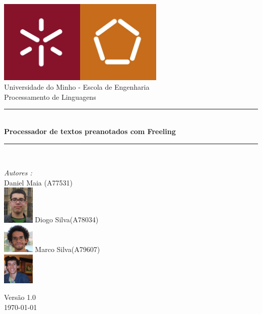\documentclass[a4paper]{article}
\begin{document}
\begin{titlepage}
\begin{center}


\includegraphics[width=0.6\textwidth]{logo.jpg}\\[0.5cm]

{\large Universidade do Minho - Escola de Engenharia}\\[0.5cm]

{\large Processamento de Linguagens}\\[0.5cm]

\rule{\linewidth}{0.5mm} \\[0.4cm]
{ \huge \bfseries Processador de textos preanotados com Freeling\\[0.4cm] }
\rule{\linewidth}{0.5mm} \\[1.5cm]

\noindent
\begin{minipage}{0.4\textwidth}
  \begin{flushleft} \large
    \emph{Autores :}\\
    Daniel Maia \textsc{(A77531)}\\
    \includegraphics[width=1.5cm]{daniel.jpg}\break
    Diogo Silva\textsc{(A78034)}\\
    \includegraphics[width=1.5cm]{afonso.jpg}\break
    Marco Silva\textsc{(A79607)}\\
    \includegraphics[width=1.5cm]{marco.jpg}\break
  \end{flushleft}
\end{minipage}%
\vfill

{\large Versão 1.0 \\ \today}

\end{center}
\end{titlepage}
\end{document}

